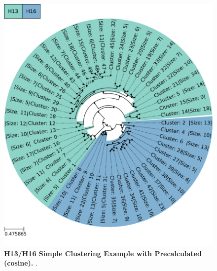 \begin{figure}[!hbt]
    \centering
    \includegraphics[width=\textwidth]{PCA/Clustertree_Segment_4_H_Cosine.pdf}
    \caption[H13/H16 Simple Clustering Example with Precalculated (cosine)]{\textbf{H13/H16 Simple Clustering Example with Precalculated (cosine).} .}
    \label{fig:Simple_Clustertree_Cosine}
\end{figure}


